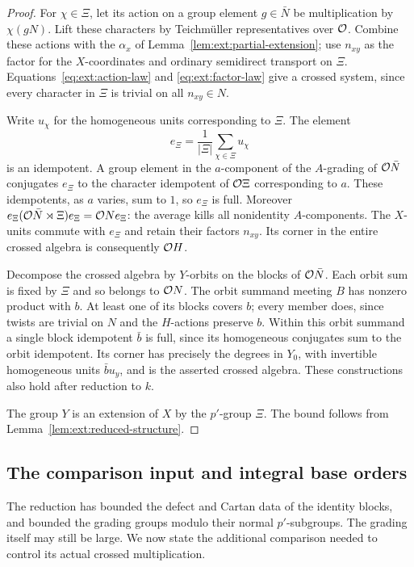 \begin{proof}
For $\chi\in\Xi$, let its action on a group element $g\in\bar N$
be multiplication by $\chi(gN)$.  Lift these characters by
Teichm\"uller representatives over $\mathcal O$.  Combine these actions
with the $\alpha_x$ of Lemma~\ref{lem:ext:partial-extension}; use
$n_{xy}$ as the factor for the $X$-coordinates and ordinary
semidirect transport on $\Xi$.  Equations~\eqref{eq:ext:action-law}
and \eqref{eq:ext:factor-law} give a crossed system, since every
character in $\Xi$ is trivial on all $n_{xy}\in N$.

Write $u_\chi$ for the homogeneous units corresponding to $\Xi$.
The element
\[
 e_\Xi=\frac1{|\Xi|}\sum_{\chi\in\Xi}u_\chi
\]
is an idempotent.  A group element in the $a$-component of the
$A$-grading of $\mathcal O\bar N$ conjugates $e_\Xi$ to the character
idempotent of $\mathcal O\Xi$ corresponding to $a$.  These idempotents,
as $a$ varies, sum to $1$, so $e_\Xi$ is full.  Moreover
$e_\Xi(\mathcal O\bar N\rtimes\Xi)e_\Xi=\mathcal O N e_\Xi$:
the average kills all nonidentity $A$-components.  The $X$-units
commute with $e_\Xi$ and retain their factors $n_{xy}$.  Its corner
in the entire crossed algebra is consequently $\mathcal O H$.

Decompose the crossed algebra by $Y$-orbits on the blocks of
$\mathcal O\bar N$.  Each orbit sum is fixed by $\Xi$ and so belongs to
$\mathcal O N$.  The orbit summand meeting $B$ has nonzero product with
$b$.  At least one of its blocks covers $b$; every member does,
since twists are trivial on $N$ and the $H$-actions preserve $b$.
Within this orbit summand a single block idempotent $\bar b$ is
full, since its homogeneous conjugates sum to the orbit idempotent.
Its corner has precisely the degrees in $Y_0$, with invertible
homogeneous units $\bar b u_y$, and is the asserted crossed
algebra.  These constructions also hold after reduction to $k$.

The group $Y$ is an extension of $X$ by the $p'$-group $\Xi$.
The bound follows from Lemma~\ref{lem:ext:reduced-structure}.
\end{proof}

\subsection{The comparison input and integral base orders}

The reduction has bounded the defect and Cartan data of the
identity blocks, and bounded the grading groups modulo their
normal $p'$-subgroups.  The grading itself may still be large.
We now state the additional comparison needed to control its
actual crossed multiplication.

